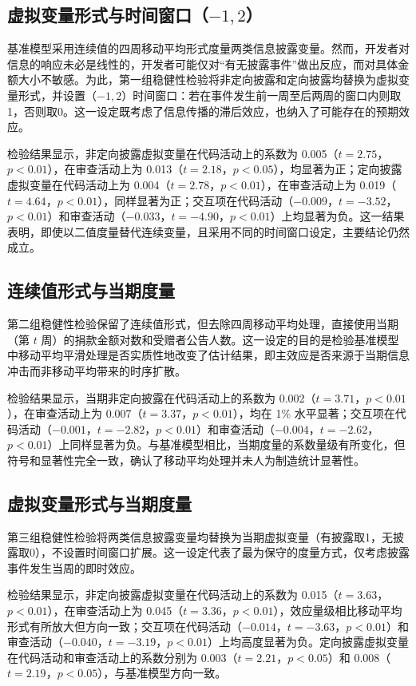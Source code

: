 \documentclass[
    type = master, %
    degree = professional,        %
    decl-page,  %
    twoside,                %
    fontset = fandol %
  ]{njuthesis}
\begin{document}
\subsection{虚拟变量形式与时间窗口（$-1, 2$）}

基准模型采用连续值的四周移动平均形式度量两类信息披露变量。然而，开发者对信息的响应未必是线性的，开发者可能仅对“有无披露事件”做出反应，而对具体金额大小不敏感。为此，第一组稳健性检验将非定向披露和定向披露均替换为虚拟变量形式，并设置（$-1, 2$）时间窗口：若在事件发生前一周至后两周的窗口内则取1，否则取0。这一设定既考虑了信息传播的滞后效应，也纳入了可能存在的预期效应。

检验结果显示，非定向披露虚拟变量在代码活动上的系数为 0.005（$t = 2.75$，$p < 0.01$），在审查活动上为 0.013（$t = 2.18$，$p < 0.05$），均显著为正；定向披露虚拟变量在代码活动上为 0.004（$t = 2.78$，$p < 0.01$），在审查活动上为 0.019（$t = 4.64$，$p < 0.01$），同样显著为正；交互项在代码活动（$-0.009$，$t = -3.52$，$p < 0.01$）和审查活动（$-0.033$，$t = -4.90$，$p < 0.01$）上均显著为负。这一结果表明，即使以二值度量替代连续变量，且采用不同的时间窗口设定，主要结论仍然成立。

\subsection{连续值形式与当期度量}

第二组稳健性检验保留了连续值形式，但去除四周移动平均处理，直接使用当期（第 $t$ 周）的捐款金额对数和受赠者公告人数。这一设定的目的是检验基准模型中移动平均平滑处理是否实质性地改变了估计结果，即主效应是否来源于当期信息冲击而非移动平均带来的时序扩散。

检验结果显示，当期非定向披露在代码活动上的系数为 0.002（$t = 3.71$，$p < 0.01$），在审查活动上为 0.007（$t = 3.37$，$p < 0.01$），均在 1\% 水平显著；交互项在代码活动（$-0.001$，$t = -2.82$，$p < 0.01$）和审查活动（$-0.004$，$t = -2.62$，$p < 0.01$）上同样显著为负。与基准模型相比，当期度量的系数量级有所变化，但符号和显著性完全一致，确认了移动平均处理并未人为制造统计显著性。

\subsection{虚拟变量形式与当期度量}

第三组稳健性检验将两类信息披露变量均替换为当期虚拟变量（有披露取1，无披露取0），不设置时间窗口扩展。这一设定代表了最为保守的度量方式，仅考虑披露事件发生当周的即时效应。

检验结果显示，非定向披露虚拟变量在代码活动上的系数为 0.015（$t = 3.63$，$p < 0.01$），在审查活动上为 0.045（$t = 3.36$，$p < 0.01$），效应量级相比移动平均形式有所放大但方向一致；交互项在代码活动（$-0.014$，$t = -3.63$，$p < 0.01$）和审查活动（$-0.040$，$t = -3.19$，$p < 0.01$）上均高度显著为负。定向披露虚拟变量在代码活动和审查活动上的系数分别为 0.003（$t = 2.21$，$p < 0.05$）和 0.008（$t = 2.19$，$p < 0.05$），与基准模型方向一致。
\end{document}
